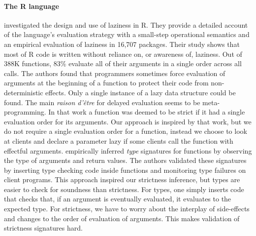 \documentclass[review,nonacm,screen,acmsmall,anonymous=true]{acmart}
\begin{document}
\paragraph{The R language} \citet{oopsla19b} investigated the design and use of
laziness in R. They provide a detailed account of the language's evaluation
strategy with a small-step operational semantics and an empirical evaluation of
laziness in 16,707 packages. Their study shows that most of R code is written
without reliance on, or awareness of, laziness. Out of 388K functions, 83\%
evaluate all of their arguments in a single order across all calls. The authors
found that programmers sometimes force evaluation of arguments at the beginning
of a function to protect their code from non-deterministic effects. Only a
single instance of a lazy data structure could be found. The main \emph{raison
d'\^etre} for delayed evaluation seems to be meta-programming. In that work a
function was deemed to be strict if it had a single evaluation order for its
arguments. Our approach is inspired by that work, but we do not require a single
evaluation order for a function, instead we choose to look at clients and
declare a parameter lazy if some clients call the function with effectful
arguments. \citet{oopsla20b} empirically inferred \emph{type} signatures for
functions by observing the type of arguments and return values. The authors
validated these signatures by inserting type checking code inside functions and
monitoring type failures on client programs. This approach inspired our strictness
inference, but types are easier to check for soundness than strictness. For
types, one simply inserts code that checks that, if an argument is eventually
evaluated, it evaluates to the expected type. For strictness, we have to worry
about the interplay of side-effects and changes to the order of evaluation of
arguments. This makes validation of strictness signatures hard.
\end{document}
